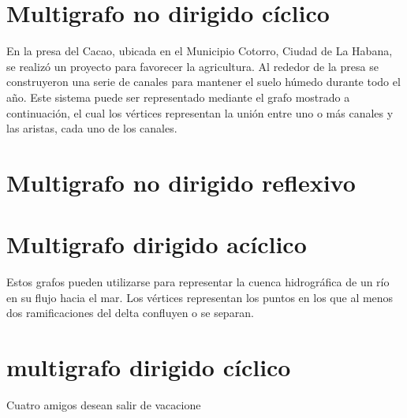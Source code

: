 \documentclass{article}
\begin{document}
\section{Multigrafo no dirigido cíclico}

En la presa del Cacao, ubicada en el Municipio Cotorro, Ciudad de La Habana, se realizó un proyecto para favorecer la agricultura. Al rededor de la presa se construyeron una serie de canales para mantener el suelo húmedo durante todo el año. Este sistema puede ser representado mediante el grafo mostrado a continuación, el cual los vértices representan la unión entre uno o más canales y las aristas, cada uno de los canales.


\section{Multigrafo no dirigido reflexivo}


\section{Multigrafo dirigido acíclico}

Estos grafos pueden utilizarse para representar la cuenca hidrográfica de un río en su flujo hacia el mar. Los vértices representan los puntos en los que al menos dos ramificaciones del delta confluyen o se separan.

\section{multigrafo dirigido cíclico}

Cuatro amigos desean salir de vacacione
\end{document}
